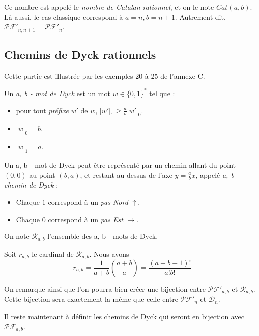 Ce nombre est appelé le \emph{nombre de Catalan rationnel}, et on le note
$Cat(a,b)$.
Là aussi, le cas classique correspond à $a = n, b = n + 1$.
Autrement dit, $\mathcal{PF'}_{n, n + 1} = \mathcal{PF'}_n$.

\subsection{Chemins de Dyck rationnels}

Cette partie est illustrée par les exemples 20 à 25 de l'annexe C.

\begin{definition}
    Un \emph{a, b - mot de Dyck} est un mot $w \in \{0,1\}^*$ tel que :
    \begin{itemize}
        \item pour tout \emph{préfixe} $w'$ de $w$,
            $\displaystyle |w'|_1 \geqslant \frac{a}{b}|w'|_0$.
        \item $|w|_0 = b$.
        \item $|w|_1 = a$.
    \end{itemize}
\end{definition}

Un a, b - mot de Dyck peut être représenté par un chemin allant du point
$(0,0)$ au point $(b,a)$, et restant au dessus de l'axe $y = \frac{a}{b}x$,
appelé \emph{a, b - chemin de Dyck} :
\begin{itemize}
    \item Chaque $1$ correspond à un \emph{pas Nord} $\uparrow$. 
    \item Chaque $0$ correspond à un \emph{pas Est} $\rightarrow$.
\end{itemize}

On note $\mathcal{R}_{a, b}$ l'ensemble des a, b - mots de Dyck.

\begin{theorem}
    Soit $r_{a,b}$ le cardinal de $\mathcal{R}_{a,b}$.
    Nous avons $$r_{a,b} = \frac{1}{a+b} \binom {a+b}{a} =
    \frac{(a+b-1)!}{a!b!}$$
\end{theorem}

On remarque ainsi que l'on pourra bien créer une bijection entre
$\mathcal{PF'}_{a,b}$ et $\mathcal{R}_{a,b}$.
Cette bijection sera exactement la même que celle entre $\mathcal{PF'}_n$
et $\mathcal{D}_{n}$.

Il reste maintenant à définir les chemins de Dyck qui seront en bijection
avec $\mathcal{PF}_{a,b}$.

